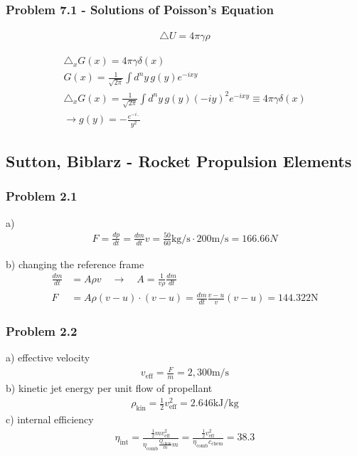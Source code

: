 \documentclass[10pt,a4paper]{article}
\theoremstyle{definition}
\begin{document}
\subsubsection{Problem 7.1 - Solutions of Poisson's Equation}
\begin{align}
    \triangle U=4\pi \gamma\rho
\end{align}

\begin{align}
    \triangle_x G(x)=4\pi \gamma\delta(x)\\
    G(x)=\frac{1}{\sqrt{2\pi}}\int d^ny\,g(y)e^{-ixy}\\
    \triangle_x G(x)=\frac{1}{\sqrt{2\pi}}\int d^ny\,g(y)(-iy)^2e^{-ixy}\equiv4\pi\gamma\delta(x)\\
    \rightarrow g(y)=-\frac{e^{-i..}}{y^2}
\end{align}

\subsection{{\sc Sutton, Biblarz} - Rocket Propulsion Elements}
\subsubsection{Problem 2.1}
a)
\begin{align}
F=\frac{dp}{dt}=\frac{dm}{dt}v=\frac{50}{60}\text{kg/s}\cdot200\text{m/s}=166.66N
\end{align}

b) changing the reference frame
\begin{align}
\frac{dm}{dt}&=A\rho v\quad\rightarrow\quad A=\frac{1}{v\rho}\frac{dm}{dt}\\
F&=A\rho(v-u)\cdot(v-u)=\frac{dm}{dt}\frac{v-u}{v}(v-u)=144.322\text{N}
\end{align}

\subsubsection{Problem 2.2}
a) effective velocity
\begin{align}
v_\text{eff}=\frac{F}{\dot{m}}=2,300\text{m/s}
\end{align}
b) kinetic jet energy per unit flow of propellant
\begin{align}
\rho_\text{kin}=\frac{1}{2}v_\text{eff}^2=2.646\text{kJ/kg}
\end{align}
c) internal efficiency
\begin{align}
\eta_\text{int}=\frac{\frac{1}{2}mv_\text{eff}^2}{\eta_\text{comb}\frac{Q_\text{chem}}{m}m}=\frac{\frac{1}{2}v_\text{eff}^2}{\eta_\text{comb}c_\text{chem}}=38.3%
\end{align}
\end{document}
